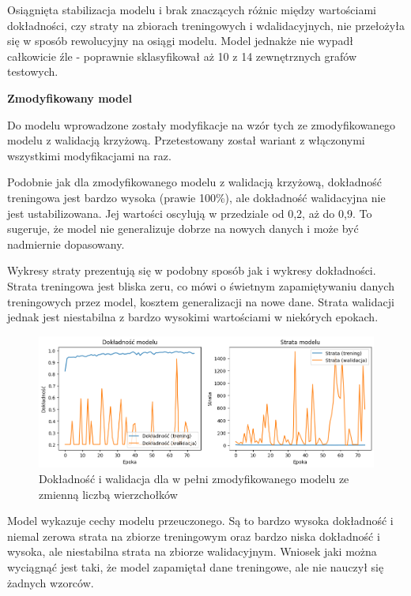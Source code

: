 Osiągnięta stabilizacja modelu i brak znaczących różnic między wartościami dokładności,
czy straty na zbiorach treningowych i wdalidacyjnych, nie przełożyła się w sposób rewolucyjny na osiągi modelu.
Model jednakże nie wypadł całkowicie źle - poprawnie sklasyfikował aż 10 z 14 zewnętrznych grafów testowych.

\textbf{Zmodyfikowany model}

Do modelu wprowadzone zostały modyfikacje na wzór tych ze zmodyfikowanego modelu z walidacją krzyżową.
Przetestowany został wariant z włączonymi wszystkimi modyfikacjami na raz.

Podobnie jak dla zmodyfikowanego modelu z walidacją krzyżową, dokładność treningowa jest bardzo wysoka (prawie 100\%),
ale dokładność walidacyjna nie jest ustabilizowana. Jej wartości oscylują w przedziale od 0,2, aż do 0,9.
To sugeruje, że model nie generalizuje dobrze na nowych danych i może być nadmiernie dopasowany.

Wykresy straty prezentują się w podobny sposób jak i wykresy dokładności.
Strata treningowa jest bliska zeru, co mówi o świetnym zapamiętywaniu danych treningowych przez model, kosztem generalizacji na nowe dane.
Strata walidacji jednak jest niestabilna z bardzo wysokimi wartościami w niekórych epokach.

\begin{figure}[ht]
	\centering
	\includegraphics[width=14cm]{resources/tests/images/v4/multiple_edges_img.png}
	\caption{Dokładność i walidacja dla w pełni zmodyfikowanego modelu ze zmienną liczbą wierzchołków}
	\label{Fig:tests-var-2a}
\end{figure}
\FloatBarrier

Model wykazuje cechy modelu przeuczonego.
Są to bardzo wysoka dokładność i niemal zerowa strata na zbiorze treningowym
oraz bardzo niska dokładność i wysoka, ale niestabilna strata na zbiorze walidacyjnym.
Wniosek jaki można wyciągnąć jest taki, że model zapamiętał dane treningowe, ale nie nauczył się żadnych wzorców.

